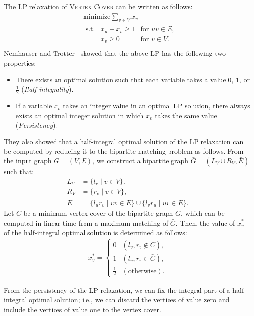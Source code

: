 \documentclass[11pt]{article}
\begin{document}
The LP relaxation of \textsc{Vertex Cover} can be written as follows:
\begin{align*}
  &\text{minimize}\displaystyle \sum_{v\in V}x_v\\
  &\begin{array}{lll}
    \text{s.t.}&x_u+x_v\geq 1 & \text{for }uv\in E,\\
    & x_v \geq 0 & \text{for } v \in V. \\
  \end{array}
\end{align*}
Nemhauser and Trotter~\cite{NemhauserT75} showed that the above LP has the following two properties:
\begin{itemize}
  \item There exists an optimal solution such that each variable takes a value $0$, $1$, or
  $\frac{1}{2}$ (\emph{Half-integrality}).
  \item If a variable $x_v$ takes an integer value in an optimal LP solution, there always exists an optimal integer
  solution in which $x_v$ takes the same value (\emph{Persistency}).
\end{itemize}
They also showed that a half-integral optimal solution of the LP relaxation can be computed by reducing it to the bipartite
matching problem as follows.
From the input graph $G=(V,E)$, we construct a bipartite graph $\bar{G}=(L_V\cup R_V, \bar{E})$ such that:
\begin{align*}
L_V&=\{l_v\mid v\in V\},\\
R_V&=\{r_v\mid v\in V\},\\
\bar{E}&=\{l_ur_v\mid uv\in E\}\cup\{l_vr_u\mid uv\in E\}.
\end{align*}
Let $\bar{C}$ be a minimum vertex cover of the bipartite graph $\bar{G}$,
which can be computed in linear-time from
a maximum matching of $\bar{G}$.
Then, the value of $x^*_v$ of the half-integral optimal solution is determined as follows:
\begin{align*}
x^*_v=\begin{cases}
0&(l_v,r_v\not\in\bar{C}),\\
1&(l_v,r_v\in\bar{C}),\\
\frac{1}{2}&(\text{otherwise}).
\end{cases}
\end{align*}

From the persistency of the LP relaxation, we can fix the integral part of a half-integral optimal solution;
i.e., we can discard the vertices of value zero and include the vertices of value one to the vertex cover.
\end{document}
